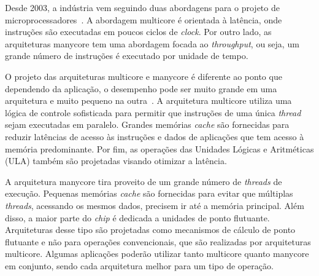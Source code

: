 Desde 2003, a indústria vem seguindo duas abordagens para o projeto de microprocessadores~\cite{kirk2016programming}. A abordagem multicore é orientada à latência, onde instruções são executadas em poucos ciclos de \textit{clock}. Por outro lado, as arquiteturas manycore tem uma abordagem focada ao \textit{throughput}, ou seja, um grande número de instruções é executado por unidade de tempo.

O projeto das arquiteturas multicore e manycore é diferente ao ponto que dependendo da aplicação, o desempenho pode ser muito grande em uma arquitetura e muito pequeno na outra~\cite{cook2012cuda}. A arquitetura multicore utiliza uma lógica de controle sofisticada para permitir que instruções de uma única \textit{thread} sejam executadas em paralelo. Grandes memórias \textit{cache} são fornecidas para reduzir latências de acesso às instruções e dados de aplicações que tem acesso à memória predominante. Por fim, as operações das Unidades Lógicas e Aritméticas (ULA) também são projetadas visando otimizar a latência.

A arquitetura manycore tira proveito de um grande número de \textit{threads} de execução. Pequenas memórias \textit{cache} são fornecidas para evitar que múltiplas \textit{threads}, acessando os mesmos dados, precisem ir até a memória principal. Além disso, a maior parte do \textit{chip} é dedicada a unidades de ponto flutuante. Arquiteturas desse tipo são projetadas como mecanismos de cálculo de ponto flutuante e não para operações convencionais, que são realizadas por arquiteturas multicore. Algumas aplicações poderão utilizar tanto multicore quanto manycore em conjunto, sendo cada arquitetura melhor para um tipo de operação.